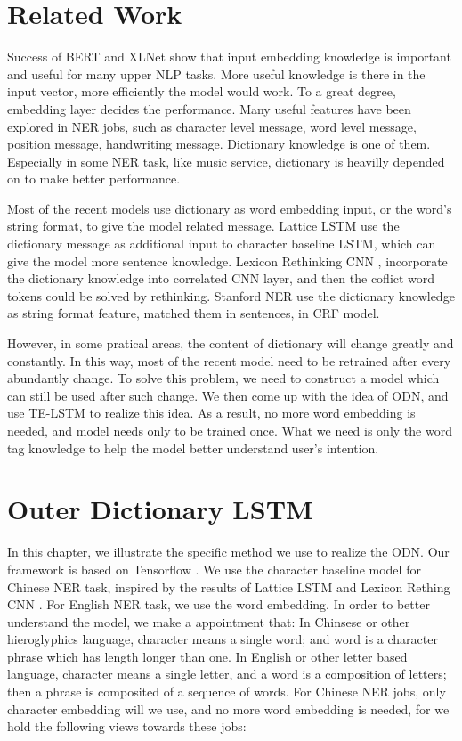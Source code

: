 \documentclass[letterpaper]{article} %
\begin{document}
\section{Related Work}
Success of BERT \cite{bert} and XLNet \cite{xlnet} show that input embedding knowledge is important and useful for many upper NLP tasks. More useful knowledge is there in the input vector, more efficiently the model would work. To a great degree, embedding layer decides the performance. Many useful features have been explored in NER jobs, such as character level message, word level message, position message, handwriting message. Dictionary knowledge is one of them. Especially in some NER task, like music service, dictionary is heavilly depended on to make better performance. 

Most of the recent models use dictionary as word embedding input, or the word's string format, to give the model related message. Lattice LSTM \cite{lattice}  use the dictionary message as additional input to character baseline LSTM, which can give the model more sentence knowledge. Lexicon Rethinking CNN \cite{lrcnn}, incorporate the dictionary knowledge into correlated CNN layer, and then the coflict word tokens could be solved by rethinking. Stanford NER \cite{stner} use the dictionary knowledge as string format feature, matched them in sentences, in CRF model.

However, in some pratical areas, the content of dictionary will change greatly and constantly. In this way, most of the recent model need to be retrained after every abundantly change. To solve this problem, we need to construct a model which can still be used after such change. We then come up with the idea of ODN, and use TE-LSTM to realize this idea. As a result, no more word embedding is needed, and model needs only to be trained once.  What we need is only the word tag knowledge to help the model better understand user's intention.

\section{Outer Dictionary LSTM}




In this chapter, we illustrate the specific method we use to realize the ODN. Our framework is based on Tensorflow \cite{tensor}. We use the character baseline model for Chinese NER task, inspired by the results of Lattice LSTM \cite{lattice} and Lexicon Rething CNN \cite{lrcnn}. For English NER task, we use the word embedding. In order to better understand the model, we make a appointment that: In Chinsese or other hieroglyphics language, character means a single word; and word is a character phrase which has length longer than one. In English or other letter based language, character means a single letter, and a word is a composition of letters; then a phrase is composited of a sequence of words. For Chinese NER jobs, only character embedding will we use, and no more word embedding is needed, for we hold the following views towards these jobs:
\end{document}

